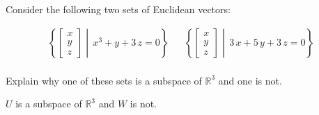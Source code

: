 
\begin{exerciseStatement}


Consider the following two sets of Euclidean vectors: 


\begin{align*}  \left\{ \left[\begin{array}{c}
x \\
y \\
z
\end{array}\right] \middle|\,x^{3} + y + 3 \, z = 0\right\}  & &   \left\{ \left[\begin{array}{c}
x \\
y \\
z
\end{array}\right] \middle|\,3 \, x + 5 \, y + 3 \, z = 0\right\}  \\ \end{align*}
            

 Explain why one of these sets is a subspace of \(\mathbb{R}^ 3 \) and one is not. 


\end{exerciseStatement}
    
\begin{exerciseAnswer} 


\(U\) is a subspace of \(\mathbb{R}^ 3 \) and \(W\) is not.


\end{exerciseAnswer}
    
